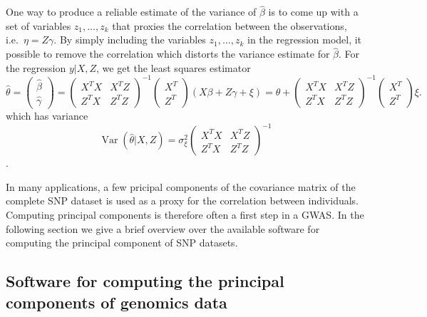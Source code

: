 \documentclass[review]{siamart0516}
\DeclareMathOperator{\Var}{Var}
\begin{document}
One way to produce a reliable estimate of the variance of $\hat{\beta}$ is to come up with a set of variables $z_1,\dots,z_k$ that proxies the correlation between the observations, i.e.\ $\eta=Z\gamma$. By simply including the variables $z_1,\dots,z_k$ in the regression model, it possible to remove the correlation which distorts the variance estimate for $\hat{\beta}$. For the regression $y|X,Z$, we get the least squares estimator
\begin{equation*}
    \hat{\theta} = \begin{pmatrix}\hat{\beta} \\ \hat{\gamma}\end{pmatrix} =
    \begin{pmatrix}
        X^TX & X^TZ \\ Z^TX & Z^TZ
    \end{pmatrix}^{-1}
    \begin{pmatrix}
        X^T \\ Z^T
    \end{pmatrix}
    (X\beta + Z\gamma + \xi)=
    \theta +
            \begin{pmatrix}
        X^TX & X^TZ \\ Z^TX & Z^TZ
    \end{pmatrix}^{-1}
    \begin{pmatrix}
        X^T \\ Z^T
    \end{pmatrix}\xi.
\end{equation*}
which has variance
\begin{equation*}
    \Var(\hat{\theta}|X,Z)=\sigma_\xi^2
        \begin{pmatrix} X^TX & X^TZ \\ Z^TX & Z^TZ \end{pmatrix}^{-1}
\end{equation*}.

In many applications, a few pricipal components of the covariance matrix of the complete SNP dataset is used as a proxy for the correlation between individuals. Computing principal components is therefore often a first step in a GWAS. In the following section we give a brief overview over the available software for computing the principal component of SNP datasets.


\subsection{Software for computing the principal components of genomics data}
\end{document}
